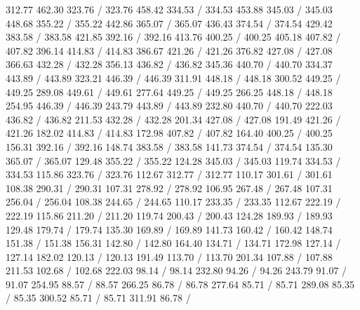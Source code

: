 { 312.77 462.30 323.76 /
 323.76 458.42 334.53 /
 334.53 453.88 345.03 /
 345.03 448.68 355.22 /
 355.22 442.86 365.07 /
 365.07 436.43 374.54 /
 374.54 429.42 383.58 /
 383.58 421.85 392.16 /
 392.16 413.76 400.25 /
 400.25 405.18 407.82 /
 407.82 396.14 414.83 /
 414.83 386.67 421.26 /
 421.26 376.82 427.08 /
 427.08 366.63 432.28 /
 432.28 356.13 436.82 /
 436.82 345.36 440.70 /
 440.70 334.37 443.89 /
 443.89 323.21 446.39 /
 446.39 311.91 448.18 /
 448.18 300.52 449.25 /
 449.25 289.08 449.61 /
 449.61 277.64 449.25 /
 449.25 266.25 448.18 /
 448.18 254.95 446.39 /
 446.39 243.79 443.89 /
 443.89 232.80 440.70 /
 440.70 222.03 436.82 /
 436.82 211.53 432.28 /
 432.28 201.34 427.08 /
 427.08 191.49 421.26 /
 421.26 182.02 414.83 /
 414.83 172.98 407.82 /
 407.82 164.40 400.25 /
 400.25 156.31 392.16 /
 392.16 148.74 383.58 /
 383.58 141.73 374.54 /
 374.54 135.30 365.07 /
 365.07 129.48 355.22 /
 355.22 124.28 345.03 /
 345.03 119.74 334.53 /
 334.53 115.86 323.76 /
 323.76 112.67 312.77 /
 312.77 110.17 301.61 /
 301.61 108.38 290.31 /
 290.31 107.31 278.92 /
 278.92 106.95 267.48 /
 267.48 107.31 256.04 /
 256.04 108.38 244.65 /
 244.65 110.17 233.35 /
 233.35 112.67 222.19 /
 222.19 115.86 211.20 /
 211.20 119.74 200.43 /
 200.43 124.28 189.93 /
 189.93 129.48 179.74 /
 179.74 135.30 169.89 /
 169.89 141.73 160.42 /
 160.42 148.74 151.38 /
 151.38 156.31 142.80 /
 142.80 164.40 134.71 /
 134.71 172.98 127.14 /
 127.14 182.02 120.13 /
 120.13 191.49 113.70 /
 113.70 201.34 107.88 /
 107.88 211.53 102.68 /
 102.68 222.03 98.14 /
 98.14 232.80 94.26 /
 94.26 243.79 91.07 /
 91.07 254.95 88.57 /
 88.57 266.25 86.78 /
 86.78 277.64 85.71 /
 85.71 289.08 85.35 /
 85.35 300.52 85.71 /
 85.71 311.91 86.78 /
}
